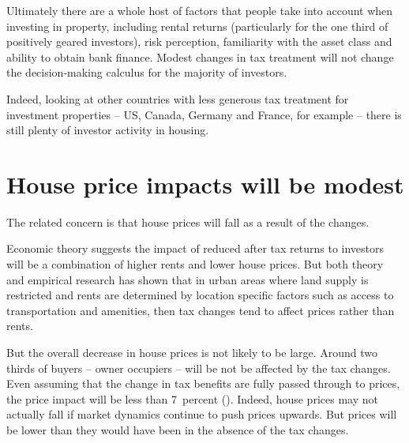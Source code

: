 \documentclass{grattan}\usepackage[]{graphicx}\usepackage[]{color}
\begin{document}
Ultimately there are a whole host of factors that people take into account when investing in property, including rental returns (particularly for the one third of positively geared investors), risk perception, familiarity with the asset class and ability to obtain bank finance.  Modest changes in tax treatment will not change the decision-making calculus for the majority of investors. 

Indeed, looking at other countries with less generous tax treatment for investment properties -- US, Canada, Germany and France, for example -- there is still plenty of investor activity in housing.

\section{House price impacts will be modest}
The related concern is that house prices will fall as a result of the changes. 

Economic theory suggests the impact of reduced after tax returns to investors will be a combination of higher rents and lower house prices.  But both theory and empirical research has shown that in urban areas where land supply is restricted and rents are determined by location specific factors such as access to transportation and amenities, then tax changes tend to affect prices rather than rents.  



But the overall decrease in house prices is not likely to be large. Around two thirds of buyers -- owner occupiers -- will be not be affected by the tax changes. Even assuming that the change in tax benefits are fully passed through to prices, the price impact will be less than 7~percent (). Indeed, house prices may not actually fall if market dynamics continue to push prices upwards. But prices will be lower than they would have been in the absence of the tax changes.
\end{document}
